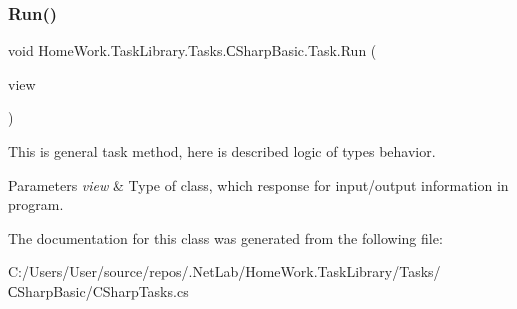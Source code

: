 \subsubsection{\texorpdfstring{Run()}{Run()}}
{\footnotesize\ttfamily void Home\+Work.\+Task\+Library.\+Tasks.\+С\+Sharp\+Basic.\+Task.\+Run (\begin{DoxyParamCaption}\item[{I\+Information}]{view }\end{DoxyParamCaption})}



This is general task method, here is described logic of types behavior. 


\begin{DoxyParams}{Parameters}
{\em view} & Type of class, which response for input/output information in program.\\
\hline
\end{DoxyParams}


The documentation for this class was generated from the following file\+:\begin{DoxyCompactItemize}
\item 
C\+:/\+Users/\+User/source/repos/.\+Net\+Lab/\+Home\+Work.\+Task\+Library/\+Tasks/С\+Sharp\+Basic/C\+Sharp\+Tasks.\+cs\end{DoxyCompactItemize}
